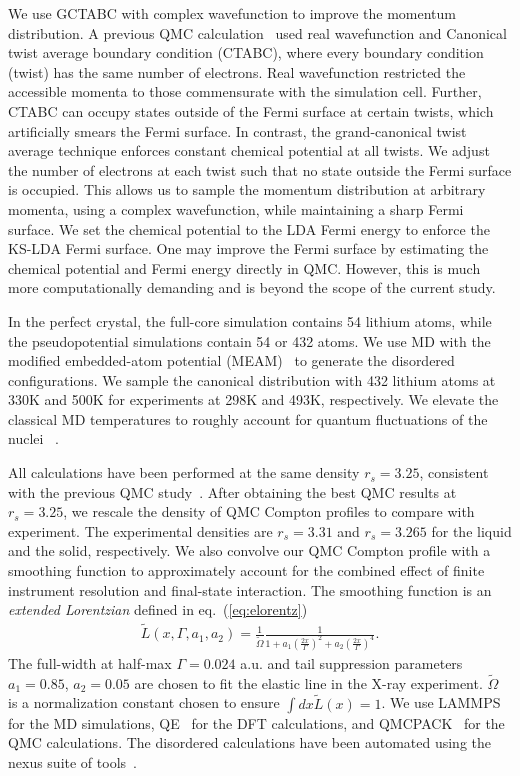 \documentclass[aps,prb,showpacs,preprintnumbers,amsmath,amssymb,superscriptaddress,twocolumn]{revtex4}
\begin{document}
We use GCTABC with complex wavefunction to improve the momentum distribution. A previous QMC calculation~\cite{Filippi1999} used real wavefunction and Canonical twist average boundary condition (CTABC), where every boundary condition (twist) has the same number of electrons. Real wavefunction restricted the accessible momenta to those commensurate with the simulation cell. Further, CTABC can occupy states outside of the Fermi surface at certain twists, which artificially smears the Fermi surface. In contrast, the grand-canonical twist average technique enforces constant chemical potential at all twists. We adjust the number of electrons at each twist such that no state outside the Fermi surface is occupied. This allows us to sample the momentum distribution at arbitrary momenta, using a complex wavefunction, while maintaining a sharp Fermi surface. We set the chemical potential to the LDA Fermi energy to enforce the KS-LDA Fermi surface. One may improve the Fermi surface by estimating the chemical potential and Fermi energy directly in QMC. However, this is much more computationally demanding and is beyond the scope of the current study.

In the perfect crystal, the full-core simulation contains 54 lithium atoms, while the pseudopotential simulations contain 54 or 432 atoms. We use MD with the modified embedded-atom potential (MEAM)~\cite{Baskes1992} to generate the disordered configurations. We sample the canonical distribution with 432 lithium atoms at 330K and 500K for experiments at 298K and 493K, respectively. We elevate the classical MD temperatures to roughly account for quantum fluctuations of the nuclei ~\cite{Filippi1998}.

All calculations have been performed at the same density $r_s=3.25$, consistent with the previous QMC study~\cite{Filippi1999}. After obtaining the best QMC results at $r_s=3.25$, we rescale the density of QMC Compton profiles to compare with experiment. The experimental densities are $r_s=3.31$ and $r_s=3.265$ for the liquid and the solid, respectively. We also convolve our QMC Compton profile with a smoothing function to approximately account for the combined effect of finite instrument resolution and final-state interaction. The smoothing function is an \emph{extended Lorentzian} defined in eq.~(\ref{eq:elorentz})
\begin{align}
\tilde{L}(x,\Gamma,a_1, a_2) = \frac{1}{\tilde{\Omega}} \frac{1}{
1+a_1(\frac{2x}{\Gamma})^2+a_2(\frac{2x}{\Gamma})^4
}.\label{eq:elorentz}
\end{align}
The full-width at half-max $\Gamma=0.024$ a.u. and tail suppression parameters $a_1=0.85$, $a_2=0.05$ are chosen to fit the elastic line in the X-ray experiment. $\tilde{\Omega}$ is a normalization constant chosen to ensure $\int dx \tilde{L}(x)=1$. We use LAMMPS~\cite{Plimpton1993} for the MD simulations, QE~\cite{Giannozzi2009,Enkovaara2017} for the DFT calculations, and QMCPACK~\cite{Kim2018} for the QMC calculations. The disordered calculations have been automated using the nexus suite of tools~\cite{Krogel2016}.
\end{document}
